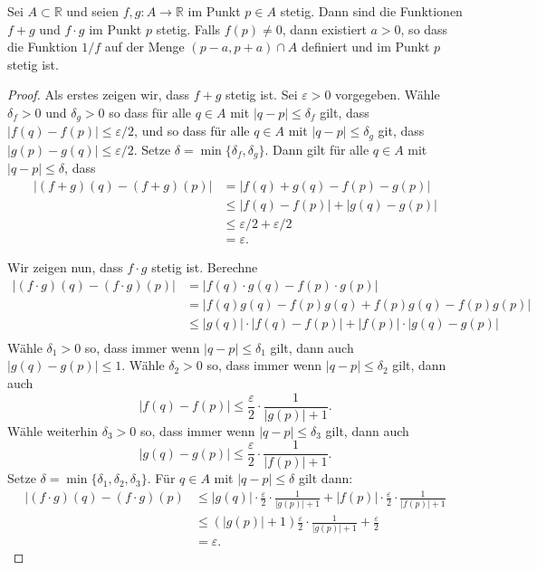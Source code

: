 \documentclass[../main.tex]{subfiles}
\begin{document}
\begin{lemma*}
  Sei $A \subset \mathbb{R}$ und seien
  $f, g \colon A \to \mathbb{R}$ im Punkt
  $p \in A$ stetig. Dann sind die Funktionen
  $f + g$ und $f \cdot g$ 
  im Punkt $p$ stetig.
  Falls $f(p) \neq 0$, dann
  existiert $a > 0$, so dass
  die Funktion $1/f$ auf der Menge
  $(p- a, p + a) \cap A$ definiert und 
  im Punkt $p$ stetig ist.
\end{lemma*}

\begin{proof}
  Als erstes zeigen wir,
  dass $f  + g$ stetig ist.
  Sei $\varepsilon > 0$ vorgegeben.
  Wähle $\delta_f > 0$ und  $\delta_g > 0$ 
  so dass für alle $q \in A$ mit
  $|q - p| \leq \delta_f$ gilt, dass
  $|f(q) - f(p)| \leq \varepsilon/2$,
  und so dass für alle
  $q \in A$ mit $|q - p| \leq \delta_g$ 
  git, dass
  $|g(p) - g(q)| \leq \varepsilon/2$.
  Setze $\delta = \min \{\delta_f, \delta_g\}$.
  Dann gilt für alle $q \in A$ mit
  $|q - p| \leq \delta$, dass
  \begin{align*}
  |(f + g)(q) - (f + g)(p)| &     = |f(q) + g(q) - f(p) - g(p)|\\
                            & \leq |f(q) - f(p)| + |g(q) - g(p)|\\
                            & \leq \varepsilon/2 + \varepsilon/2\\
                            &= \varepsilon.
  \end{align*}

  Wir zeigen nun, dass $f \cdot g$ stetig ist.
  Berechne
  \begin{align*}
     |(f\cdot g)(q) - (f \cdot g)(p)|
     & = |f(q) \cdot g(q) - f(p) \cdot g(p)| \\
     & = |f(q)g(q) - f(p)g(q) + f(p)g(q) - f(p) g(p)| \\
     & \leq |g(q)| \cdot |f(q) - f(p)| + 
     |f(p)| \cdot |g(q) - g(p)| \\
  \end{align*}
  Wähle $\delta_1 > 0$ so, dass immer wenn
  $|q - p| \leq \delta_1$ gilt, dann auch
  $|g(q) - g(p)| \leq 1$. Wähle
  $\delta_2 > 0$ so, dass immer
  wenn $|q - p| \leq \delta_2$ gilt, dann auch
  \[
    |f(q) - f(p)| \leq \frac{\varepsilon}{2} \cdot
    \frac{1}{|g(p)| + 1}.
  \]
  Wähle weiterhin $\delta_3 > 0$ so, dass immer wenn
  $|q - p| \leq \delta_3$ gilt, dann auch
  \[
    |g(q) - g(p)| \leq \frac{\varepsilon}{2} \cdot
    \frac{1}{|f(p)| + 1}.
  \]
  Setze $\delta = \min \{\delta_1, \delta_2, \delta_3 \}$.
  Für $q \in A$ mit $|q - p| \leq \delta$ gilt dann:
  \begin{align*}
    |(f \cdot g)(q) - (f \cdot g)(p)
    &\leq |g(q)| \cdot \frac{\varepsilon}{2} \cdot  
    \frac{1}{|g(p)| + 1}
    + |f(p)| \cdot \frac{\varepsilon}{2}
    \cdot \frac{1}{|f(p)| + 1}\\
    & \leq (|g(p)| + 1) \frac{\varepsilon}{2}
    \cdot \frac{1}{|g(p)| + 1} + \frac{\varepsilon}{2}  \\
    &= \varepsilon.
  \end{align*}
  

\end{proof}
\end{document}
